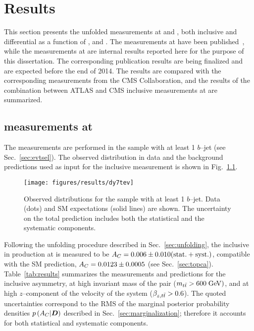 \chapter{Results}
\label{sec:results}

This section presents the unfolded \ac{} measurements at \seventev{}
and \eighttev{}, both inclusive and differential as a function of \mtt{},
\pttt{} and \ytt{}. The measurements at \seventev{} have been
published~\cite{Aad:2013cea}, while the measurements at \eighttev{}
are internal results reported here for the purpose of this
dissertation. The corresponding publication results are being
finalized and are expected before the end of 2014. The results are
compared with the corresponding measurements from the CMS
Collaboration, and the results of the combination between ATLAS and
CMS inclusive measurements at \seventev{} are summarized.

\section{\ac{} measurements at \seventev{}}
\label{sec:res7tev}

The measurements are performed in the \ljets{} sample with
at least 1 $b$--jet (see Sec.~\ref{sec:evtsel}). The observed \dy{}
distribution in data and the background predictions used as input for
the inclusive measurement is shown in Fig.~\ref{fig:dy7tev}.

\begin{figure}[!htb]\centering
  \texttt{[image: figures/results/dy7tev]} 
  \caption{Observed \dy{} distributions for the \ljets{}
    sample with at least 1 $b$--jet. Data (dots) and SM expectations
    (solid lines) are shown. The uncertainty on the total prediction
    includes both the statistical and the systematic components.}
  \label{fig:dy7tev}
\end{figure}

Following the unfolding procedure described in
Sec.~\ref{sec:unfolding}, the inclusive \ac{} in \ttbar{} production
at \seventev{} is measured to be $A_C{}=
0.006\pm0.010(\rm{stat.}+\rm{syst.})$, compatible with the SM
prediction, $A_C{}=0.0123\pm0.0005$ (see Sec.~\ref{sec:topca}).
Table~\ref{tab:results} summarizes the
measurements and predictions for the inclusive asymmetry, at high
invariant mass of the \ttbar{} pair ($m_{t\bar{t}}{} >600 \; \mathrm{GeV}{})$, and at
high $z$--component of the velocity of the \ttbar{} system ($\beta_{z,t\bar{t}}{}>0.6$).
The quoted uncertainties correspond to the RMS of the marginal posterior
probability densities $p\left(A_C{}|\boldsymbol{D}{}\right)$ described in
Sec.~\ref{sec:marginalization}; therefore it accounts for both
statistical and systematic components.

